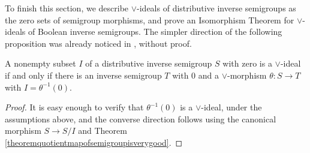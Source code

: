 To finish this section, we describe $\lor$-ideals of distributive inverse semigroups as the zero sets of semigroup morphisms, and prove an Isomorphism Theorem for $\lor$-ideals of Boolean inverse semigroups. The simpler direction of the following proposition was already noticed in \cite[Proposition 2.10]{MR3519501}, without proof.

\begin{proposition}
A nonempty subset $I$ of a distributive inverse semigroup $S$ with zero is a $\lor$-ideal if and only if there is an inverse semigroup $T$ with $0$ and a $\lor$-morphism $\theta:S\to T$ with $I=\theta^{-1}(0)$.
\end{proposition}
\begin{proof}
It is easy enough to verify that $\theta^{-1}(0)$ is a $\lor$-ideal, under the assumptions above, and the converse direction follows using the canonical morphism $S\to S/I$ and Theorem \ref{theoremquotientmapofsemigroupisverygood}.\qedhere
\end{proof}


